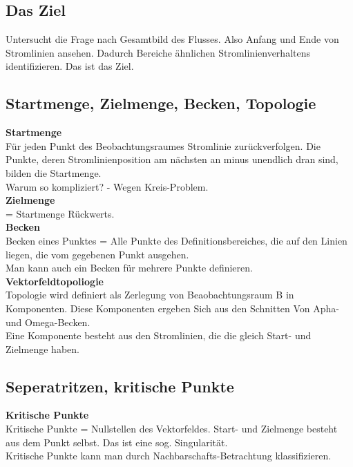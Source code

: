 \documentclass{article}
\begin{document}
\subsection{Das Ziel}
Untersucht die Frage nach Gesamtbild des Flusses. Also Anfang und Ende von Stromlinien ansehen. Dadurch Bereiche ähnlichen Stromlinienverhaltens identifizieren. Das ist das Ziel.\\

\subsection{Startmenge, Zielmenge, Becken, Topologie}
\noindent \textbf{Startmenge}\\
Für jeden Punkt des Beobachtungsraumes Stromlinie zurückverfolgen. Die Punkte, deren Stromlinienposition am nächsten an minus unendlich dran sind, bilden die Startmenge.\\
Warum so kompliziert? - Wegen Kreis-Problem.\\

\noindent \textbf{Zielmenge}\\
= Startmenge Rückwerts.\\

\noindent \textbf{Becken}\\
Becken eines Punktes = Alle Punkte des Definitionsbereiches, die auf den Linien liegen, die vom gegebenen Punkt ausgehen.\\ 
Man kann auch ein Becken für mehrere Punkte definieren.\\

\noindent \textbf{Vektorfeldtopoliogie}\\
Topologie wird definiert als Zerlegung von Beaobachtungsraum B in Komponenten. Diese Komponenten ergeben Sich aus den Schnitten Von Apha- und Omega-Becken. \\
Eine Komponente besteht aus den Stromlinien, die die gleich Start- und Zielmenge haben.


\subsection{Seperatritzen, kritische Punkte}
\noindent \textbf{Kritische Punkte}\\
Kritische Punkte = Nullstellen des Vektorfeldes. Start- und Zielmenge besteht aus dem Punkt selbst. Das ist eine sog. Singularität.\\
Kritische Punkte kann man durch Nachbarschafts-Betrachtung klassifizieren.\\
\end{document}
